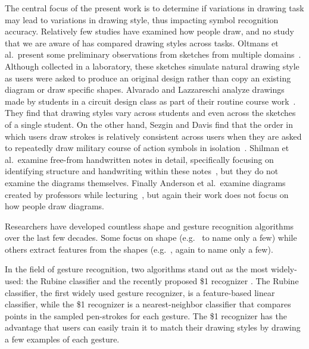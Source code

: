 \documentclass[final,5p,twocolumn]{elsarticle}
\begin{document}
The central focus of the present work is to determine if variations
in drawing task may lead to variations in 
drawing style, thus impacting symbol recognition accuracy.
Relatively few studies have examined how people
draw, and no study that we are aware of has compared drawing styles
across tasks.  Oltmans et al.~present some preliminary observations
from sketches from multiple domains~\cite{Oltmans2004ETCHASketch}.
Although collected in a laboratory, these sketches simulate natural
drawing style as users were asked to produce an original design rather
than copy an existing diagram or draw specific shapes.  Alvarado and
Lazzareschi analyze drawings made by students in a circuit design
class as part of their routine course work~\cite{Alvarado2007Properties}.  
They find that drawing styles
vary across students and even across the sketches of a single student.  On
the other hand, Sezgin and Davis find that the order in which users draw
strokes is relatively consistent across users when they are asked
to repeatedly draw military course of action symbols in
isolation~\cite{Sezgin2007Sketch}.  Shilman et al.~examine free-from
handwritten notes in detail, specifically focusing on identifying
structure and handwriting within these
notes~\cite{Shilman2003Discerning}, but they do not examine the
diagrams themselves.  Finally Anderson et al.~examine
diagrams created by professors while
lecturing~\cite{Anderson2005Study}, but again their work does not
focus on how people draw diagrams.
  
Researchers have developed countless shape and gesture recognition
algorithms over the last few decades.  Some focus on shape
(e.g.~\cite{Hammond2004Automatically,Alvarado2004SketchREAD,Miller2005Data,Kara2005ImageBased,dollar}
to name only a few) while others extract features from the shapes
(e.g.~\cite{Blagojevic2008Data,Hse2004ssr,rubine,Fonseca02cali,Lee2006Efficient},
again to name only a few).  

In the field of gesture recognition, two
algorithms stand out as the most widely-used: the Rubine classifier \cite{rubine}
and the recently proposed \$1 recognizer \cite{dollar}.  The Rubine classifier, the
first widely used gesture recognizer, is a feature-based linear
classifier, while the \$1 recognizer is a nearest-neighbor classifier
that compares points in the sampled pen-strokes for each gesture.  The
\$1 recognizer has the advantage that users can easily train it to
match their drawing styles by drawing a few examples of each gesture.
\end{document}
